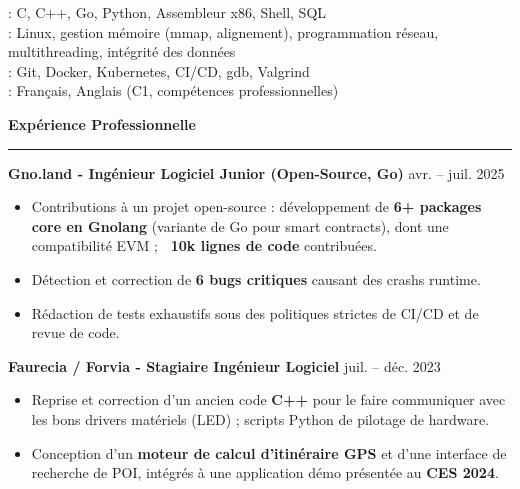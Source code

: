 \documentclass[9pt]{extarticle}
\begin{document}
\hspace*{5pt}{\bfseries Langages}: C, C++, Go, Python, Assembleur x86, Shell, SQL
\\
\hspace*{5pt}{\bfseries Systèmes}: Linux, gestion mémoire (mmap, alignement), programmation réseau, multithreading, intégrité des données
\\
\hspace*{5pt}{\bfseries Outils}: Git, Docker, Kubernetes, CI/CD, gdb, Valgrind
\\
\hspace*{5pt}{\bfseries Langues}: Français, Anglais (C1, compétences professionnelles)

\par\vspace{5pt}

{\large\bfseries Expérience Professionnelle}
\par\vspace{-8pt}
\rule{\linewidth}{0.4pt}
\par\vspace{5pt}

{\bfseries Gno.land - Ingénieur Logiciel Junior (Open-Source, Go)} \hfill avr. -- juil. 2025
\begin{itemize}[noitemsep, topsep=0pt]
	\item Contributions à un projet open-source : développement de {\bfseries 6+ packages core en Gnolang} (variante de Go pour smart contracts), dont une compatibilité EVM ; {\bfseries ~10k lignes de code} contribuées.
	\item Détection et correction de {\bfseries 6 bugs critiques} causant des crashs runtime.
	\item Rédaction de tests exhaustifs sous des politiques strictes de CI/CD et de revue de code.
\end{itemize}

\par\vspace{5pt}

{\bfseries Faurecia / Forvia - Stagiaire Ingénieur Logiciel} \hfill juil. -- déc. 2023
\begin{itemize}[noitemsep, topsep=0pt]
	\item Reprise et correction d'un ancien code {\bfseries C++} pour le faire communiquer avec les bons drivers matériels (LED) ; scripts Python de pilotage de hardware.
	\item Conception d'un {\bfseries moteur de calcul d'itinéraire GPS} et d'une interface de recherche de POI, intégrés à une application démo présentée au {\bfseries CES 2024}.
\end{itemize}
\end{document}
